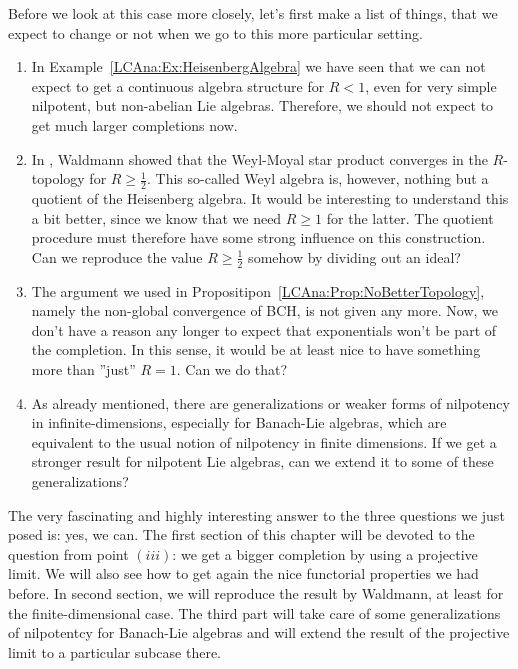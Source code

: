 Before we look at this case more closely, let's first make a list of things, 
that we expect to change or not when we go to this more particular setting.
\begin{enumerate}
	\item
	In Example~\ref{LCAna:Ex:HeisenbergAlgebra} we have seen that we can not 
	expect to get a continuous algebra structure for $R < 1$, even for very 
	simple nilpotent, but non-abelian Lie algebras. Therefore, we should not 
	expect to get much larger completions now.
	
	\item
	In \cite{waldmann:2014a}, Waldmann showed that the Weyl-Moyal star product 
	converges in the $R$-topology for $R \geq \frac{1}{2}$. This so-called 
	Weyl algebra is, however, nothing but a quotient of the Heisenberg 
	algebra. It would be interesting to understand this a bit better, since we 
	know that we need $R \geq 1$ for the latter. The quotient procedure must 
	therefore have some strong influence on this construction. Can we 
	reproduce the value $R \geq \frac{1}{2}$ somehow by dividing out an ideal?
	
	\item
	The argument we used in Propositipon~\ref{LCAna:Prop:NoBetterTopology},
	namely the non-global convergence of BCH, is not given any more. Now, we 
	don't have a reason any longer to expect that exponentials won't be part 
	of the completion. In this sense, it would be at least nice to have 
	something more than ''just'' $R = 1$. Can we do that?
	
	\item
	As already mentioned, there are generalizations or weaker forms of 
	nilpotency in infinite-dimensions, especially for Banach-Lie algebras, 
	which are equivalent to the usual notion of nilpotency in finite 
	dimensions. If we get a stronger result for nilpotent Lie algebras, can we 
	extend it to some of these generalizations?
\end{enumerate}
The very fascinating and highly interesting answer to the three questions we 
just posed is: yes, we can. The first section of this chapter will be devoted 
to the question from point $(iii)$: we get a bigger completion by using a 
projective limit. We will also see how to get again the nice functorial 
properties we had before. In second section, we will reproduce the result by 
Waldmann, at least for the finite-dimensional case. The third part will take 
care of some generalizations of nilpotentcy for Banach-Lie algebras and will 
extend the result of the projective limit to a particular subcase there.



